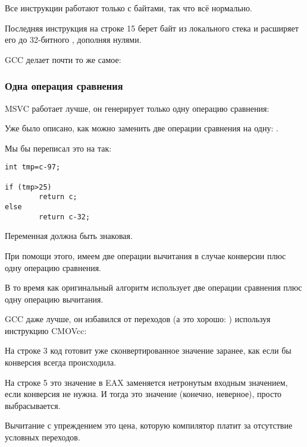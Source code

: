 Все инструкции работают только с байтами, так что всё нормально.

Последняя инструкция  на строке 15 берет байт из локального стека и расширяет его 
до 32-битного \Tint, дополняя нулями.

\NonOptimizing GCC делает почти то же самое:



\subsubsection{Одна операция сравнения}
\label{toupper_one_comparison}

\Optimizing MSVC работает лучше, он генерирует только одну операцию сравнения:



Уже было описано, как можно заменить две операции сравнения на одну: .

Мы бы переписал это на \CCpp так:

\begin{lstlisting}[style=customc]
int tmp=c-97;

if (tmp>25)
        return c;
else
        return c-32;
\end{lstlisting}

Переменная  должна быть знаковая.

При помощи этого, имеем две операции вычитания в случае конверсии плюс одну операцию сравнения.

В то время как оригинальный алгоритм использует две операции сравнения плюс одну операцию вычитания.

\Optimizing GCC 
даже лучше, он избавился от переходов (а это хорошо: ) используя инструкцию CMOVcc:



На строке 3 код готовит уже сконвертированное значение заранее, как если бы конверсия всегда происходила.

На строке 5 это значение в EAX заменяется нетронутым входным значением, если конверсия не нужна.
И тогда это значение (конечно, неверное), просто выбрасывается.

Вычитание с упреждением это цена, которую компилятор платит за отсутствие условных переходов.

